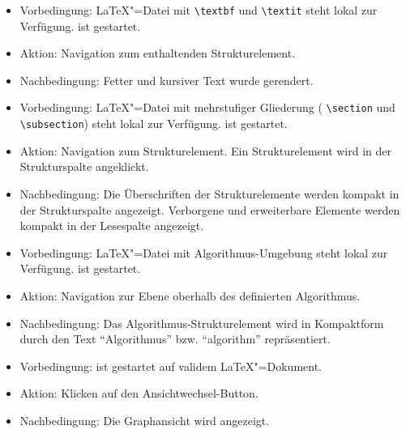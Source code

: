 \begin{itemize}
  \item Vorbedingung: \LaTeX"=Datei mit \verb|\textbf| und \verb|\textit| steht lokal zur Verfügung.
  \texla{} ist gestartet.
  \item Aktion: Navigation zum enthaltenden Strukturelement.
  \item Nachbedingung: Fetter und kursiver Text wurde gerendert.
\end{itemize}

\begin{itemize}
  \item Vorbedingung: \LaTeX"=Datei mit mehrstufiger Gliederung (\zB{} \verb|\section| und \verb|\subsection|) steht
  lokal zur Verfügung.
  \texla{} ist gestartet.
  \item Aktion: Navigation zum Strukturelement.
  Ein Strukturelement wird in der Strukturspalte angeklickt.
  \item Nachbedingung: Die Überschriften der Strukturelemente werden kompakt in der Strukturspalte angezeigt.
  Verborgene und erweiterbare Elemente werden kompakt in der Lesespalte angezeigt.
\end{itemize}

\begin{itemize}
  \item Vorbedingung: \LaTeX"=Datei mit Algorithmus-Umgebung steht lokal zur Verfügung.
  \texla{} ist gestartet.
  \item Aktion: Navigation zur Ebene oberhalb des definierten Algorithmus.
  \item Nachbedingung: Das Algorithmus-Strukturelement wird in Kompaktform durch den Text \enquote{Algorithmus} bzw.
  \enquote{algorithm} repräsentiert.
\end{itemize}

\begin{itemize}
  \item Vorbedingung: \texla{} ist gestartet auf validem \LaTeX"=Dokument.
  \item Aktion: Klicken auf den Ansichtwechsel-Button.
  \item Nachbedingung: Die Graphansicht wird angezeigt.
\end{itemize}

